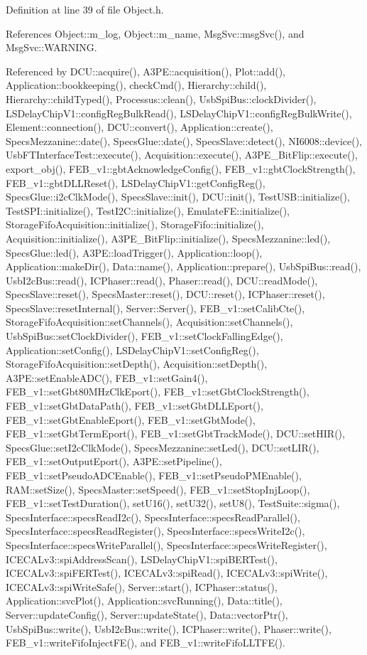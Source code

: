 Definition at line 39 of file Object.h.

References Object::m\_\-log, Object::m\_\-name, MsgSvc::msgSvc(), and MsgSvc::WARNING.

Referenced by DCU::acquire(), A3PE::acquisition(), Plot::add(), Application::bookkeeping(), checkCmd(), Hierarchy::child(), Hierarchy::childTyped(), Processus::clean(), UsbSpiBus::clockDivider(), LSDelayChipV1::configRegBulkRead(), LSDelayChipV1::configRegBulkWrite(), Element::connection(), DCU::convert(), Application::create(), SpecsMezzanine::date(), SpecsGlue::date(), SpecsSlave::detect(), NI6008::device(), UsbFTInterfaceTest::execute(), Acquisition::execute(), A3PE\_\-BitFlip::execute(), export\_\-obj(), FEB\_\-v1::gbtAcknowledgeConfig(), FEB\_\-v1::gbtClockStrength(), FEB\_\-v1::gbtDLLReset(), LSDelayChipV1::getConfigReg(), SpecsGlue::i2cClkMode(), SpecsSlave::init(), DCU::init(), TestUSB::initialize(), TestSPI::initialize(), TestI2C::initialize(), EmulateFE::initialize(), StorageFifoAcquisition::initialize(), StorageFifo::initialize(), Acquisition::initialize(), A3PE\_\-BitFlip::initialize(), SpecsMezzanine::led(), SpecsGlue::led(), A3PE::loadTrigger(), Application::loop(), Application::makeDir(), Data::name(), Application::prepare(), UsbSpiBus::read(), UsbI2cBus::read(), ICPhaser::read(), Phaser::read(), DCU::readMode(), SpecsSlave::reset(), SpecsMaster::reset(), DCU::reset(), ICPhaser::reset(), SpecsSlave::resetInternal(), Server::Server(), FEB\_\-v1::setCalibCte(), StorageFifoAcquisition::setChannels(), Acquisition::setChannels(), UsbSpiBus::setClockDivider(), FEB\_\-v1::setClockFallingEdge(), Application::setConfig(), LSDelayChipV1::setConfigReg(), StorageFifoAcquisition::setDepth(), Acquisition::setDepth(), A3PE::setEnableADC(), FEB\_\-v1::setGain4(), FEB\_\-v1::setGbt80MHzClkEport(), FEB\_\-v1::setGbtClockStrength(), FEB\_\-v1::setGbtDataPath(), FEB\_\-v1::setGbtDLLEport(), FEB\_\-v1::setGbtEnableEport(), FEB\_\-v1::setGbtMode(), FEB\_\-v1::setGbtTermEport(), FEB\_\-v1::setGbtTrackMode(), DCU::setHIR(), SpecsGlue::setI2cClkMode(), SpecsMezzanine::setLed(), DCU::setLIR(), FEB\_\-v1::setOutputEport(), A3PE::setPipeline(), FEB\_\-v1::setPseudoADCEnable(), FEB\_\-v1::setPseudoPMEnable(), RAM::setSize(), SpecsMaster::setSpeed(), FEB\_\-v1::setStopInjLoop(), FEB\_\-v1::setTestDuration(), setU16(), setU32(), setU8(), TestSuite::sigma(), SpecsInterface::specsReadI2c(), SpecsInterface::specsReadParallel(), SpecsInterface::specsReadRegister(), SpecsInterface::specsWriteI2c(), SpecsInterface::specsWriteParallel(), SpecsInterface::specsWriteRegister(), ICECALv3::spiAddressScan(), LSDelayChipV1::spiBERTest(), ICECALv3::spiFERTest(), ICECALv3::spiRead(), ICECALv3::spiWrite(), ICECALv3::spiWriteSafe(), Server::start(), ICPhaser::status(), Application::svcPlot(), Application::svcRunning(), Data::title(), Server::updateConfig(), Server::updateState(), Data::vectorPtr(), UsbSpiBus::write(), UsbI2cBus::write(), ICPhaser::write(), Phaser::write(), FEB\_\-v1::writeFifoInjectFE(), and FEB\_\-v1::writeFifoLLTFE().


